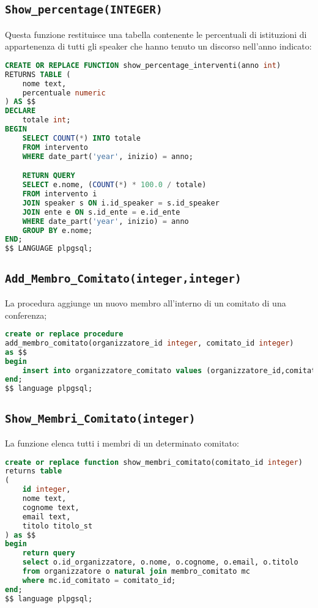 \subsection{\texttt{Show\_percentage(INTEGER)}}
Questa funzione restituisce una tabella contenente le percentuali di istituzioni di appartenenza di tutti gli speaker che hanno tenuto un discorso nell'anno indicato:
\begin{lstlisting}[language=SQL,style=mystyle]
CREATE OR REPLACE FUNCTION show_percentage_interventi(anno int)
RETURNS TABLE (
    nome text,
    percentuale numeric
) AS $$
DECLARE
    totale int;
BEGIN
    SELECT COUNT(*) INTO totale
    FROM intervento
    WHERE date_part('year', inizio) = anno;

    RETURN QUERY
    SELECT e.nome, (COUNT(*) * 100.0 / totale)
    FROM intervento i
    JOIN speaker s ON i.id_speaker = s.id_speaker
    JOIN ente e ON s.id_ente = e.id_ente
    WHERE date_part('year', inizio) = anno
    GROUP BY e.nome;
END;
$$ LANGUAGE plpgsql;
\end{lstlisting}
\subsection{\texttt{Add\_Membro\_Comitato(integer,integer)}}
La procedura aggiunge un nuovo membro all'interno di un comitato di una conferenza;
\begin{lstlisting}[language=SQL,style=mystyle]
create or replace procedure 
add_membro_comitato(organizzatore_id integer, comitato_id integer)
as $$
begin
    insert into organizzatore_comitato values (organizzatore_id,comitato_id);
end;
$$ language plpgsql;
\end{lstlisting}
\subsection{\texttt{Show\_Membri\_Comitato(integer)}}
La funzione elenca tutti i membri di un determinato comitato:
\begin{lstlisting}[language=SQL,style=mystyle]
create or replace function show_membri_comitato(comitato_id integer)
returns table
(
    id integer,
    nome text,
    cognome text,
    email text,
    titolo titolo_st
) as $$
begin
    return query
    select o.id_organizzatore, o.nome, o.cognome, o.email, o.titolo
    from organizzatore o natural join membro_comitato mc
    where mc.id_comitato = comitato_id;
end;
$$ language plpgsql;
\end{lstlisting}
